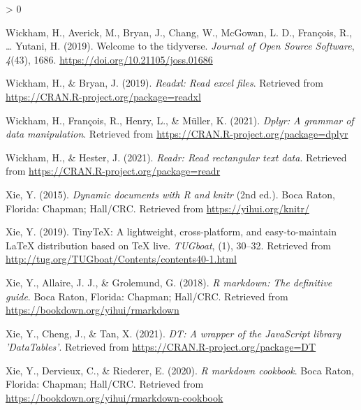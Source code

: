\documentclass[
  english,
  man]{apa6}
\newlength{\cslhangindent}
\newenvironment{CSLReferences}[2] %
 {%
  \setlength{\parindent}{0pt}
  \ifodd #1 \everypar{\setlength{\hangindent}{\cslhangindent}}\ignorespaces\fi
  \ifnum #2 > 0
  \setlength{\parskip}{#2\baselineskip}
  \fi
 }%
 {}
\begin{document}
\begin{CSLReferences}{1}{0}
\leavevmode\hypertarget{ref-R-tidyverse}{}%
Wickham, H., Averick, M., Bryan, J., Chang, W., McGowan, L. D., François, R., \ldots{} Yutani, H. (2019). Welcome to the {tidyverse}. \emph{Journal of Open Source Software}, \emph{4}(43), 1686. \url{https://doi.org/10.21105/joss.01686}

\leavevmode\hypertarget{ref-R-readxl}{}%
Wickham, H., \& Bryan, J. (2019). \emph{Readxl: Read excel files}. Retrieved from \url{https://CRAN.R-project.org/package=readxl}

\leavevmode\hypertarget{ref-R-dplyr}{}%
Wickham, H., François, R., Henry, L., \& Müller, K. (2021). \emph{Dplyr: A grammar of data manipulation}. Retrieved from \url{https://CRAN.R-project.org/package=dplyr}

\leavevmode\hypertarget{ref-R-readr}{}%
Wickham, H., \& Hester, J. (2021). \emph{Readr: Read rectangular text data}. Retrieved from \url{https://CRAN.R-project.org/package=readr}

\leavevmode\hypertarget{ref-R-knitr}{}%
Xie, Y. (2015). \emph{Dynamic documents with {R} and knitr} (2nd ed.). Boca Raton, Florida: Chapman; Hall/CRC. Retrieved from \url{https://yihui.org/knitr/}

\leavevmode\hypertarget{ref-R-tinytex}{}%
Xie, Y. (2019). TinyTeX: A lightweight, cross-platform, and easy-to-maintain LaTeX distribution based on TeX live. \emph{TUGboat}, (1), 30--32. Retrieved from \url{http://tug.org/TUGboat/Contents/contents40-1.html}

\leavevmode\hypertarget{ref-R-rmarkdown_a}{}%
Xie, Y., Allaire, J. J., \& Grolemund, G. (2018). \emph{R markdown: The definitive guide}. Boca Raton, Florida: Chapman; Hall/CRC. Retrieved from \url{https://bookdown.org/yihui/rmarkdown}

\leavevmode\hypertarget{ref-R-DT}{}%
Xie, Y., Cheng, J., \& Tan, X. (2021). \emph{DT: A wrapper of the JavaScript library 'DataTables'}. Retrieved from \url{https://CRAN.R-project.org/package=DT}

\leavevmode\hypertarget{ref-R-rmarkdown_b}{}%
Xie, Y., Dervieux, C., \& Riederer, E. (2020). \emph{R markdown cookbook}. Boca Raton, Florida: Chapman; Hall/CRC. Retrieved from \url{https://bookdown.org/yihui/rmarkdown-cookbook}

\end{CSLReferences}

\endgroup
\end{document}
